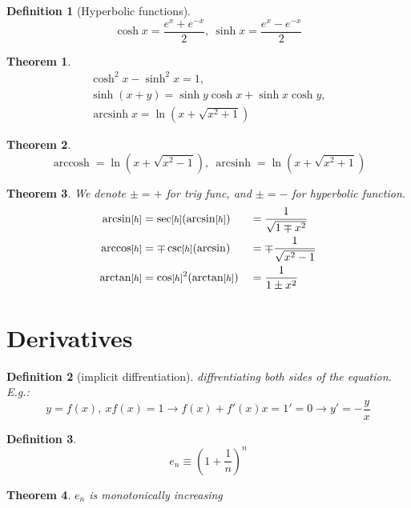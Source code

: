 \documentclass[]{article}
\newtheorem{theorem}{Theorem}[section]
\newtheorem{definition}{Definition}[section]
\newcommand\sinhx {\sinh x}
\newcommand\coshx {\cosh x}
\DeclareMathOperator{\arccosh}{arccosh}
\DeclareMathOperator{\arcsinh}{arcsinh}
\newcommand\h     {\text{\!\footnotesize$[h]$\normalsize}}
\newcommand\cl [1]    {\left ( #1 \right )}
\begin{document}
\begin{multicols}{2}
		\begin{definition}[Hyperbolic functions]
			\[ \coshx = \frac{e^x + e^{-x}}{2}, \ \sinhx = \frac{e^x - e^{-x}}{2} \]
		\end{definition}
		
		\begin{theorem}
			\begin{gather*}
				\cosh^2x - \sinh^2x = 1, \\
				\sinh(x + y) = \sinh y \coshx + \sinhx \cosh y, \\ 
				\arcsinh x = \ln(x + \sqrt{x^2 + 1})
			\end{gather*}
		\end{theorem}
		
		\begin{theorem}
			\[ \arccosh = \ln(x + \sqrt{x^2 - 1}), \ \arcsinh = \ln(x + \sqrt{x^2 + 1}) \]
		\end{theorem}
		
		\begin{theorem}
			We denote $\pm = +$ for trig func, and $\pm = -$ for hyperbolic function.
			\begin{alignat*}{9}
				\arcsin\h &= \sec\h(\arcsin\h) &&= \frac{1}{\sqrt{1 \mp x^2}} \\
				\arccos\h &= \mp\csc\h(\arcsin) &&= \mp \frac{1}{\sqrt{x^2 - 1}} \\
				\arctan\h &= \cos\h^2(\arctan\h) &&= \frac{1}{1 \pm x^2}
			\end{alignat*}
		\end{theorem}
		
		
		
		\section{Derivatives}
		
		\begin{definition}[implicit diffrentiation]
			diffrentiating both sides of the equation. E.g.: 
			\[ y = f(x), \ xf(x) = 1 \to f(x) + f'(x)x = 1' = 0 \to y' = -\frac{y}{x} \]
		\end{definition}
		
		\begin{definition}
			\[ e_n \equiv \cl{1 + \frac{1}{n}}^n \]
		\end{definition}
		
		\begin{theorem}
			$e_n$ is monotonically increasing
		\end{theorem}
		

\end{multicols}
\end{document}
